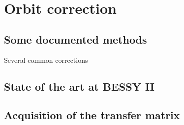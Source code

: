 
\chapter{Orbit correction}
\label{sec:correction}
\section{Some documented methods}

Several common corrections
\section{State of the art at BESSY II}
\section{Acquisition of the transfer matrix}

